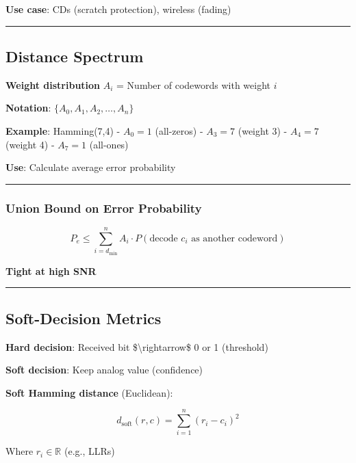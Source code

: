 \textbf{Use case}: CDs (scratch protection), wireless (fading)

\begin{center}\rule{0.5\linewidth}{0.5pt}\end{center}

\subsection{Distance Spectrum}\label{distance-spectrum}

\textbf{Weight distribution} \(A_i\) = Number of codewords with weight
\(i\)

\textbf{Notation}: \(\{A_0, A_1, A_2, \ldots, A_n\}\)

\textbf{Example}: Hamming(7,4) - \(A_0 = 1\) (all-zeros) - \(A_3 = 7\)
(weight 3) - \(A_4 = 7\) (weight 4) - \(A_7 = 1\) (all-ones)

\textbf{Use}: Calculate average error probability

\begin{center}\rule{0.5\linewidth}{0.5pt}\end{center}

\subsubsection{Union Bound on Error
Probability}\label{union-bound-on-error-probability}

\[
P_e \leq \sum_{i=d_{\min}}^{n} A_i \cdot P(\text{decode } c_i \text{ as another codeword})
\]

\textbf{Tight at high SNR}

\begin{center}\rule{0.5\linewidth}{0.5pt}\end{center}

\subsection{Soft-Decision Metrics}\label{soft-decision-metrics}

\textbf{Hard decision}: Received bit \$\textbackslash rightarrow\$ 0 or
1 (threshold)

\textbf{Soft decision}: Keep analog value (confidence)

\textbf{Soft Hamming distance} (Euclidean):

\[
d_{\text{soft}}(r, c) = \sum_{i=1}^{n} (r_i - c_i)^2
\]

Where \(r_i \in \mathbb{R}\) (e.g., LLRs)

